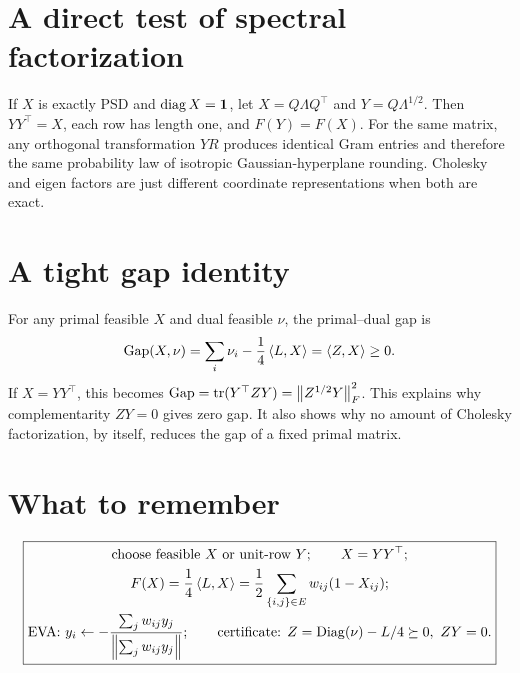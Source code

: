 \section{A direct test of spectral factorization}
If $X$ is exactly PSD and $\operatorname{diag} X=\boldsymbol{1}$, let $X=Q\Lambda Q^\top$ and $Y=Q\Lambda^{1/2}$. Then $YY^\top=X$, each row has length one, and $F(Y)=F(X)$. For the same matrix, any orthogonal transformation $YR$ produces identical Gram entries and therefore the same probability law of isotropic Gaussian-hyperplane rounding. Cholesky and eigen factors are just different coordinate representations when both are exact.

\section{A tight gap identity}
For any primal feasible $X$ and dual feasible $\nu$, the primal--dual gap is
\[
\mathrm{Gap}(X,\nu)=\sum_i\nu_i-\frac14\left\langle L,X\right\rangle=\left\langle Z,X\right\rangle\ge0.
\]
If $X=YY^\top$, this becomes $\mathrm{Gap}=\operatorname{tr}(Y^\top ZY)=\left\lVert Z^{1/2}Y\right\rVert_F^2$. This explains why complementarity $ZY=0$ gives zero gap. It also shows why no amount of Cholesky factorization, by itself, reduces the gap of a fixed primal matrix.

\section{What to remember}
\begin{takeaway}
\[
\boxed{
\begin{gathered}
\text{choose feasible }X\ \text{or unit-row }Y;\qquad X=YY^\top;\\
F(X)=\frac14\left\langle L,X\right\rangle=\frac12\sum_{\{i,j\}\in E}w_{ij}(1-X_{ij});\\
\text{EVA: }y_i\gets-\frac{\sum_jw_{ij}y_j}{\left\lVert \sum_jw_{ij}y_j\right\rVert};\qquad
\text{certificate: }Z=\operatorname{Diag}(\nu)-L/4\succeq0,\ ZY=0.
\end{gathered}}
\]
\end{takeaway}
